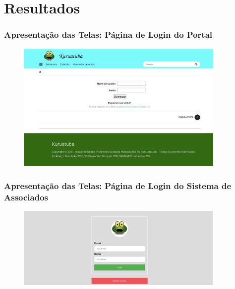 \documentclass[xcolor=table]{beamer}
\begin{document}


\section{Resultados}
\begin{frame}
    \frametitle{Apresentação das Telas: Página de Login do Portal}
    \begin{figure}[htb]
        \centering
        \includegraphics[width=0.9\textwidth]{../figuras/kuruatuba_portal_login.png}
        \label{fig:login-portal}
    \end{figure}
\end{frame}

\begin{frame}
    \frametitle{Apresentação das Telas: Página de Login do Sistema de Associados}
    \begin{figure}[htb]
        \centering
        \includegraphics[width=0.9\textwidth]{../figuras/kuruatuba_sistema_login.png}
        \label{fig:login-sistema}
    \end{figure}
\end{frame}
\end{document}
